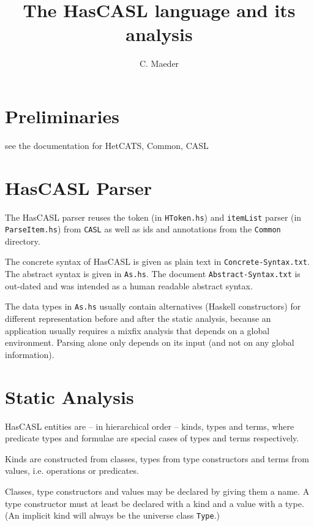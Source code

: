 \documentclass{article}
\begin{document}
\title{The HasCASL language and its analysis}

\author{C. Maeder}

\maketitle

\section{Preliminaries}

see the documentation for HetCATS, Common, CASL

\section{HasCASL Parser}
The HasCASL parser reuses the token (in \texttt{HToken.hs}) and
\texttt{itemList} parser (in \texttt{ParseItem.hs}) from \texttt{CASL} as well
as ids and annotations from the \texttt{Common} directory.

The concrete syntax of HasCASL is given as plain text in
\texttt{Concrete-Syntax.txt}. The abstract syntax is given in
\texttt{As.hs}. The document \texttt{Abstract-Syntax.txt} is out-dated and was
intended as a human readable abstract syntax.

The data types in \texttt{As.hs} usually contain alternatives (Haskell
constructors) for different representation before and after the static
analysis, because an application usually requires a mixfix analysis that
depends on a global environment. Parsing alone only depends on its input
(and not on any global information).

\section{Static Analysis}

HasCASL entities are -- in hierarchical
order -- kinds, types and terms, where predicate types and formulae are
special cases of types and terms respectively.

Kinds are constructed from classes, types from type
constructors and terms from values, i.e. operations or predicates.

Classes, type constructors and values may be declared by giving them a name.
A type constructor must at least be declared with a kind and a value with a
type. (An implicit kind will always be the universe class \texttt{Type}.)
\end{document}

